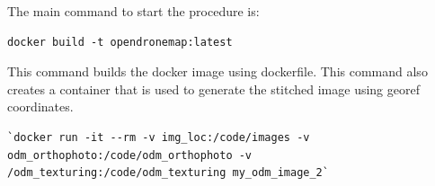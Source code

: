 The main command to start the procedure is:

\begin{lstlisting}
docker build -t opendronemap:latest
\end{lstlisting}

This command builds the docker image using dockerfile. This command also creates a container that is used to generate the stitched image using georef coordinates.

\begin{lstlisting}
`docker run -it --rm -v img_loc:/code/images -v odm_orthophoto:/code/odm_orthophoto -v 
/odm_texturing:/code/odm_texturing my_odm_image_2`
\end{lstlisting}


